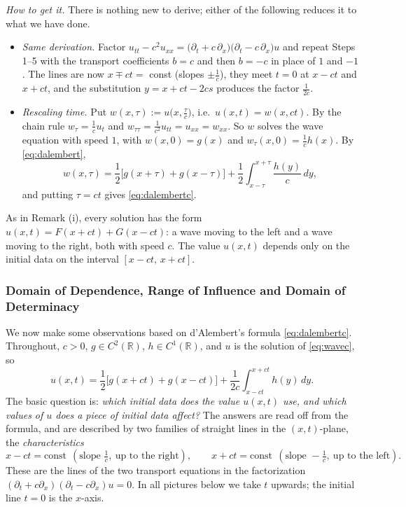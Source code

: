 \documentclass[11pt]{article}
\theoremstyle{plain}
\theoremstyle{definition}
\theoremstyle{remark}
\begin{document}
\emph{How to get it.} There is nothing new to derive; either of the following reduces it to what we have done.
\begin{itemize}
    \item \emph{Same derivation.} Factor $u_{tt} - c^2u_{xx} = \big(\partial_t + c\,\partial_x\big)\big(\partial_t - c\,\partial_x\big)u$ and repeat Steps 1--5 with the transport coefficients $b = c$ and then $b = -c$ in place of $1$ and $-1$. The lines are now $x \mp ct = $ const (slopes $\pm\frac1c$), they meet $t = 0$ at $x - ct$ and $x + ct$, and the substitution $y = x + ct - 2cs$ produces the factor $\frac{1}{2c}$.
    \item \emph{Rescaling time.} Put $w(x,\tau) := u\big(x, \frac{\tau}{c}\big)$, i.e.\ $u(x,t) = w(x,ct)$. By the chain rule $w_\tau = \frac1c u_t$ and $w_{\tau\tau} = \frac{1}{c^2}u_{tt} = u_{xx} = w_{xx}$. So $w$ solves the wave equation with speed $1$, with $w(x,0) = g(x)$ and $w_\tau(x,0) = \frac1c h(x)$. By \eqref{eq:dalembert},
    $$ w(x,\tau) = \frac12\big[g(x + \tau) + g(x - \tau)\big] + \frac12\int_{x-\tau}^{x+\tau}\frac{h(y)}{c}\, dy, $$
    and putting $\tau = ct$ gives \eqref{eq:dalembertc}.
\end{itemize}

As in Remark (i), every solution has the form $u(x,t) = F(x + ct) + G(x - ct)$: a wave moving to the left and a wave moving to the right, both with speed $c$. The value $u(x,t)$ depends only on the initial data on the interval $[x - ct,\, x + ct]$.


\subsubsection{Domain of Dependence, Range of Influence and Domain of Determinacy}\label{sssec:dod}

We now make some observations based on d'Alembert's formula \eqref{eq:dalembertc}. Throughout, $c > 0$, $g \in C^2(\mathbb{R})$, $h \in C^1(\mathbb{R})$, and $u$ is the solution of \eqref{eq:wavec}, so
$$ u(x,t) = \frac12\big[g(x + ct) + g(x - ct)\big] + \frac{1}{2c}\int_{x-ct}^{x+ct} h(y)\, dy. $$
The basic question is: \emph{which initial data does the value $u(x,t)$ use, and which values of $u$ does a piece of initial data affect?} The answers are read off from the formula, and are described by two families of straight lines in the $(x,t)$-plane, the \emph{characteristics}
$$ x - ct = \text{const} \ \ (\text{slope } \tfrac1c,\ \text{up to the right}), \qquad x + ct = \text{const} \ \ (\text{slope } -\tfrac1c,\ \text{up to the left}). $$
These are the lines of the two transport equations in the factorization $(\partial_t + c\partial_x)(\partial_t - c\partial_x)u = 0$. In all pictures below we take $t$ upwards; the initial line $t = 0$ is the $x$-axis.
\end{document}
